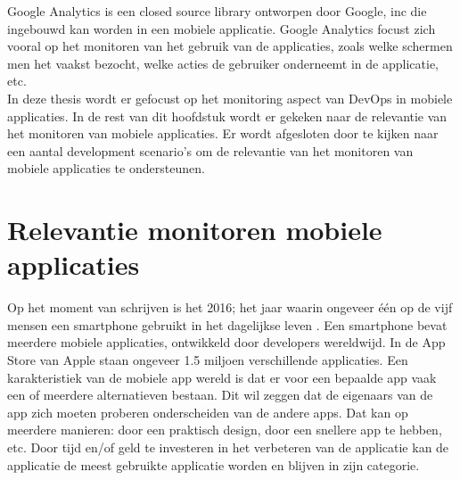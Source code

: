 Google Analytics is een closed source library ontworpen door Google, inc die ingebouwd kan worden in een mobiele applicatie. Google Analytics focust zich vooral op het monitoren van het gebruik van de applicaties, zoals welke schermen men het vaakst bezocht, welke acties de gebruiker onderneemt in de applicatie, etc.\\

In deze thesis wordt er gefocust op het monitoring aspect van DevOps in mobiele applicaties. In de rest van dit hoofdstuk wordt er gekeken naar de relevantie van het monitoren van mobiele applicaties. Er wordt afgesloten door te kijken naar een aantal development scenario's om de relevantie van het monitoren van mobiele applicaties te ondersteunen.


\section{Relevantie monitoren mobiele applicaties}
Op het moment van schrijven is het 2016; het jaar waarin ongeveer \'e\'en op de vijf mensen een smartphone gebruikt in het dagelijkse leven \cite{SmartphoneUsers}. Een smartphone bevat meerdere mobiele applicaties, ontwikkeld door developers wereldwijd. In de App Store van Apple staan ongeveer 1.5 miljoen verschillende applicaties. Een karakteristiek van de mobiele app wereld is dat er voor een bepaalde app vaak een of meerdere alternatieven bestaan. Dit wil zeggen dat de eigenaars van de app zich moeten proberen onderscheiden van de andere apps. Dat kan op meerdere manieren: door een praktisch design, door een snellere app te hebben, etc. Door tijd en/of geld te investeren in het verbeteren van de applicatie kan de applicatie de meest gebruikte applicatie worden en blijven in zijn categorie. \\

